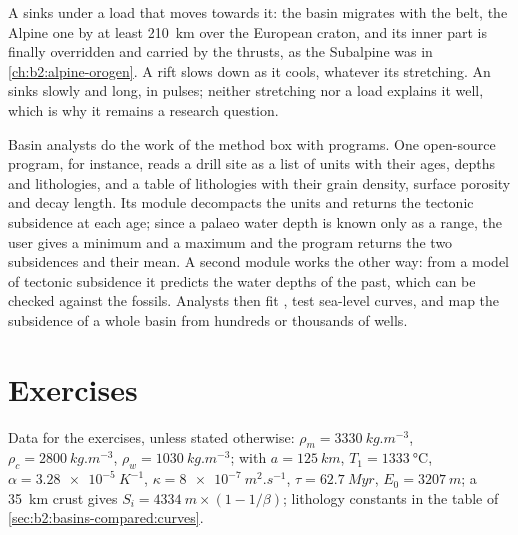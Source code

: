A  sinks under a load that moves towards it: the basin migrates with the belt,
the Alpine one by at least \qty{210}{km} over the European craton, and its inner part is
finally overridden and carried by the thrusts, as the Subalpine  was in
\cref{ch:b2:alpine-orogen}. A rift slows down as it cools, whatever
its stretching. An  sinks slowly and long, in pulses; neither stretching
nor a load explains it well, which is why it remains a research question.

\begin{inthelab}
Basin analysts do the work of the method box with programs. One open-source program, for
instance, reads a drill site as a list of units with their ages, depths and lithologies, and a
table of lithologies with their grain density, surface porosity and decay length. Its
 module decompacts the units and returns the tectonic subsidence at each age;
since a palaeo water depth is known only as a range, the user gives a minimum and a maximum and
the program returns the two subsidences and their mean. A second module works the other way:
from a model of tectonic subsidence it predicts the water depths of the past, which can be
checked against the fossils. Analysts then fit , test sea-level curves, and
map the subsidence of a whole basin from hundreds or thousands of wells.
\end{inthelab}

\section*{Exercises}\label{sec:b2:basins-compared:exercises}

Data for the exercises, unless stated otherwise: $\rho_m = \qty{3330}{kg.m^{-3}}$, $\rho_c =
\qty{2800}{kg.m^{-3}}$, $\rho_w = \qty{1030}{kg.m^{-3}}$;  with $a =
\qty{125}{km}$, $T_1 = \qty{1333}{\celsius}$, $\alpha = \qty{3.28e-5}{K^{-1}}$, $\kappa =
\qty{8e-7}{m^2.s^{-1}}$, $\tau = \qty{62.7}{Myr}$, $E_0 = \qty{3207}{m}$; a \qty{35}{km} crust
gives $S_i = \qty{4334}{m}\times(1 - 1/\beta)$; lithology constants in the table of
\cref{sec:b2:basins-compared:curves}.

